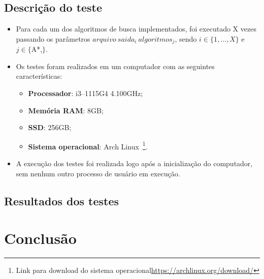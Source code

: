 \documentclass[12pt, a4paper]{article}
\begin{document}
\subsection{Descrição do teste}
\begin{itemize}
    \item Para cada um dos algoritmos de busca implementados,
    foi executado X vezes passando os parâmetros \( arquivo ~ saida_i ~ algoritmos_j \),
    sendo \( i \in \{1, \ldots, X\} \) e \( j \in \{ \)A*,\( \} \).
    \item Os testes foram realizados em um computador com as seguintes características:
    \begin{itemize}
        \item\textbf{Processador}: i3--1115G4 4.100GHz;
        \item\textbf{Memória RAM}: 8GB\@;
        \item\textbf{SSD}: 256GB\@;
        \item\textbf{Sistema operacional}: Arch Linux~\footnote{Link para download do sistema operacional\url{https://archlinux.org/download/}}.
    \end{itemize}
    \item A execução dos testes foi realizada logo após a inicialização do computador, sem nenhum outro processo de usuário em execução.
\end{itemize}

\subsection{Resultados dos testes}\label{sec:res}


\section{Conclusão}\label{sec:concl}

%
\end{document}
